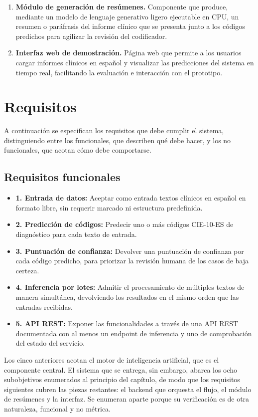 \begin{enumerate}
 \item \textbf{Módulo de generación de resúmenes.} Componente que produce, mediante un modelo de lenguaje generativo ligero ejecutable en CPU, un resumen o paráfrasis del informe clínico que se presenta junto a los códigos predichos para agilizar la revisión del codificador.

 \item \textbf{Interfaz web de demostración.} Página web que permite a los usuarios cargar informes clínicos en español y visualizar las predicciones del sistema en tiempo real, facilitando la evaluación e interacción con el prototipo.
\end{enumerate}

\section{Requisitos}

A continuación se especifican los requisitos que debe cumplir el sistema, distinguiendo entre los funcionales, que describen qué debe hacer, y los no funcionales, que acotan cómo debe comportarse.

\subsection{Requisitos funcionales}

\begin{itemize}
 \item \textbf{1. Entrada de datos:} Aceptar como entrada textos clínicos en español en formato libre, sin requerir marcado ni estructura predefinida.
 \item \textbf{2. Predicción de códigos:} Predecir uno o más códigos CIE-10-ES de diagnóstico para cada texto de entrada.
 \item \textbf{3. Puntuación de confianza:} Devolver una puntuación de confianza por cada código predicho, para priorizar la revisión humana de los casos de baja certeza.
 \item \textbf{4. Inferencia por lotes:} Admitir el procesamiento de múltiples textos de manera simultánea, devolviendo los resultados en el mismo orden que las entradas recibidas.
 \item \textbf{5. API REST:} Exponer las funcionalidades a través de una API REST documentada con al menos un endpoint de inferencia y uno de comprobación del estado del servicio.
\end{itemize}

Los cinco anteriores acotan el motor de inteligencia artificial, que es el componente central. El sistema que se entrega, sin embargo, abarca los ocho subobjetivos enumerados al principio del capítulo, de modo que los requisitos siguientes cubren las piezas restantes: el backend que orquesta el flujo, el módulo de resúmenes y la interfaz. Se enumeran aparte porque su verificación es de otra naturaleza, funcional y no métrica.

